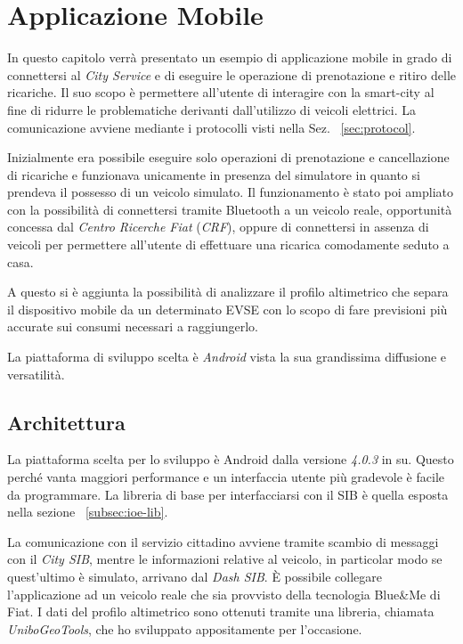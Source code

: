 \chapter{Applicazione Mobile}\label{chap:mobile-app}

In questo capitolo verrà presentato un esempio di applicazione mobile in grado di connettersi al \emph{City Service} e di eseguire le operazione di prenotazione e ritiro delle ricariche. Il suo scopo è permettere all'utente di interagire con la smart-city al fine di ridurre le problematiche derivanti dall'utilizzo di veicoli elettrici. La comunicazione avviene mediante i protocolli visti nella Sez. ~\ref{sec:protocol}.

Inizialmente era possibile eseguire solo operazioni di prenotazione e cancellazione di ricariche e funzionava unicamente in presenza del simulatore in quanto si prendeva il possesso di un veicolo simulato. Il funzionamento è stato poi ampliato con la possibilità di connettersi tramite Bluetooth a un veicolo reale, opportunità concessa dal \emph{Centro Ricerche Fiat} (\emph{CRF}), oppure di connettersi in assenza di veicoli per permettere all'utente di effettuare una ricarica comodamente seduto a casa.

A questo si è aggiunta la possibilità di analizzare il profilo altimetrico che separa il dispositivo mobile da un determinato EVSE con lo scopo di fare previsioni più accurate sui consumi necessari a raggiungerlo.

La piattaforma di sviluppo scelta è \emph{Android} vista la sua grandissima diffusione e versatilità.

\section{Architettura}

La piattaforma scelta per lo sviluppo è Android dalla versione \emph{4.0.3} in su. Questo perché vanta maggiori performance e un interfaccia utente più gradevole è facile da programmare. La libreria di base per interfacciarsi con il SIB è quella esposta nella sezione ~\ref{subsec:ioe-lib}.

La comunicazione con il servizio cittadino avviene tramite scambio di messaggi con il \emph{City SIB}, mentre le informazioni relative al veicolo, in particolar modo se quest'ultimo è simulato, arrivano dal \emph{Dash SIB}. È possibile collegare l'applicazione ad un veicolo reale che sia provvisto della tecnologia Blue\&{}Me di Fiat. I dati del profilo altimetrico sono ottenuti tramite una libreria, chiamata \emph{UniboGeoTools}, che ho sviluppato appositamente per l'occasione.

